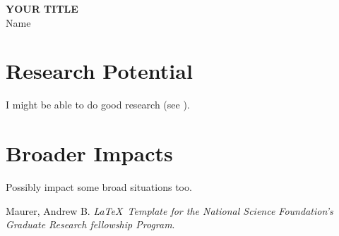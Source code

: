 \documentclass[12pt]{article}
\begin{document}

\begin{center}
\large{\bf YOUR TITLE} \\
Name
\end{center}


\section*{Research Potential}
I might be able to do good research (see \cite{amau}).

\section*{Broader Impacts}
Possibly impact some broad situations too.


\footnotesize
\begin{thebibliography}{aa}

 Maurer, Andrew B. \emph{\LaTeX \ Template for the National Science Foundation's Graduate Research fellowship Program}.

\end{thebibliography}
\end{document}
